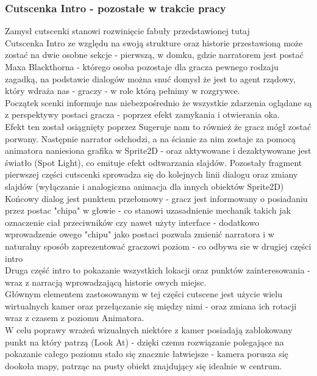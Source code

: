 \subsubsection{Cutscenka Intro - pozostałe w trakcie pracy}

Zamysł cutscenki stanowi rozwinięcie fabuły przedstawionej tutaj  \\
Cutscenka Intro ze względu na swoją strukture oraz historie przestawioną może zostać na dwie osobne sekcje - pierwszą, w domku, gdzie narratorem jest postać Maxa Blackthorna - którego osoba pozostaje dla gracza pewnego rodzaju zagadką, na podstawie dialogów można snuć domysł że jest to agent rządowy, który wdraża nas - graczy - w role którą pełnimy w rozgrywce.\\
Początek scenki informuje nas niebezpośrednio że wszystkie zdarzenia oglądane są z perspektywy postaci gracza - poprzez efekt zamykania i otwierania oka.\\
Efekt ten został osiągnięty poprzez 
Sugeruje nam to również że gracz mógł zostać porwany.
Następnie narrator odchodzi, a na ścianie za nim zostaje za pomocą animatora naniesiona grafika w Sprite2D - oraz aktywowane i dezaktywowane jest światło (Spot Light), co emituje efekt odtwarzania slajdów.
Pozostały fragment pierwszej części cutscenki sprowadza się do kolejnych linii dialogu oraz zmiany slajdów (wyłączanie i analogiczna animacja dla innych obiektów Sprite2D)\\
Końcowy dialog jest punktem przełomowy - gracz jest informowany o posiadaniu przez postac "chipa" w głowie - co stanowi uzasadnienie mechanik takich jak oznaczenie ciał przeciwników czy nawet użyty interface - dodatkowo wprowadzenie owego "chipu" jako postaci pozwala zmienić narratora i w naturalny sposób zaprezentować graczowi poziom - co odbywa sie w drugiej części intro\\
Druga część intro to pokazanie wszystkich lokacji oraz punktów zainteresowania - wraz z narracją wprowadzającą historie owych miejsc.\\
Głównym elementem zastosowanym w tej części cutscene jest użycie wielu wirtualnych kamer oraz przełączanie się między nimi - oraz zmiana ich rotacji wraz z czasem z poziomu Animatora.\\
W celu poprawy wrażeń wizualnych niektóre z kamer posiadają zablokowany punkt na który patrzą (Look At) - dzięki czemu rozwiązanie polegające na pokazanie całego poziomu stało się znacznie łatwiejsze - kamera porusza się dookoła mapy, patrząc na pusty obiekt znajdujący się idealnie w centrum.\\
